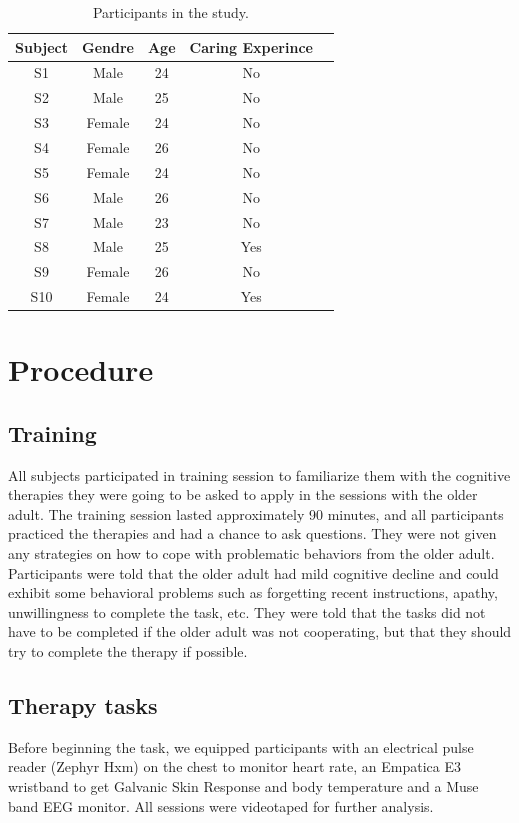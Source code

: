 \begin{table}[h]
\centering
\caption{Participants in the study.}
\label{Participants }
\begin{tabular}{|c|c|c|c|c|}
\hline
 \textbf{Subject}&  \textbf{Gendre}&  \textbf{Age}&  \textbf{Caring Experince}  \\ \hline
 S1& Male & 24 & No   \\ \hline
 S2& Male &  25&  No  \\ \hline
 S3& Female & 24 & No   \\ \hline
 S4& Female & 26 & No  \\ \hline
 S5& Female & 24 & No   \\ \hline
 S6& Male & 26 &  No  \\ \hline
 S7& Male & 23 &  No \\ \hline
 S8& Male & 25 &  Yes  \\ \hline
 S9& Female & 26 & No   \\ \hline
 S10& Female & 24 & Yes  \\ \hline
\end{tabular}
\end{table}
\section{Procedure}
\subsection{Training}
All subjects participated in training session to familiarize 
them with the cognitive therapies they were going to be asked
to apply in the sessions with the older adult. The training
session lasted approximately 90 minutes, and all participants
practiced the therapies and had a chance to ask questions.
They were not given any strategies on how to cope with 
problematic behaviors from the older adult. Participants 
were told that the older adult had mild cognitive decline 
and could exhibit some behavioral problems such as forgetting 
recent instructions, apathy, unwillingness to complete the
task, etc. They were told that the tasks did not have to be 
completed if the older adult was not cooperating, but that they
should try to complete the therapy if possible. 
\subsection{Therapy tasks}
Before beginning the task, we equipped participants
with an electrical pulse reader (Zephyr Hxm) on the
chest to monitor heart rate, an Empatica E3 wristband 
to get Galvanic Skin Response and body temperature  
and a Muse band EEG monitor. All sessions were videotaped
for further analysis. 

